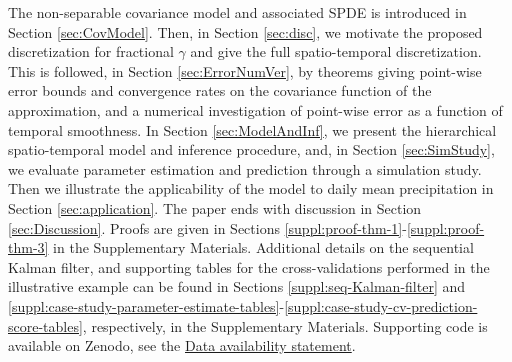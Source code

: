 \documentclass[12pt]{article} %
\begin{document}
The non-separable covariance model and associated SPDE is introduced in Section \ref{sec:CovModel}. Then, in Section \ref{sec:disc}, we motivate the proposed discretization for fractional $\gamma$ and give the full spatio-temporal discretization. This is followed, in Section \ref{sec:ErrorNumVer},  by theorems giving point-wise error bounds and convergence rates on the covariance function of the approximation, and a numerical investigation of point-wise error as a function of temporal smoothness. In 
Section \ref{sec:ModelAndInf}, we present the hierarchical spatio-temporal model and inference procedure, and, in Section \ref{sec:SimStudy}, we evaluate parameter estimation and prediction through a simulation study. Then we illustrate the applicability of the model to daily mean precipitation in Section \ref{sec:application}. The paper ends with discussion in Section \ref{sec:Discussion}. Proofs are given in Sections \ref{suppl:proof-thm-1}-\ref{suppl:proof-thm-3} in the Supplementary Materials. Additional details on the sequential Kalman filter, and supporting tables for the cross-validations performed in the illustrative example can be found in Sections \ref{suppl:seq-Kalman-filter} and \ref{suppl:case-study-parameter-estimate-tables}-\ref{suppl:case-study-cv-prediction-score-tables}, respectively, in the Supplementary Materials. Supporting code is available on Zenodo, see the \hyperref[sec:data-availability]{Data availability statement}.
\end{document}
